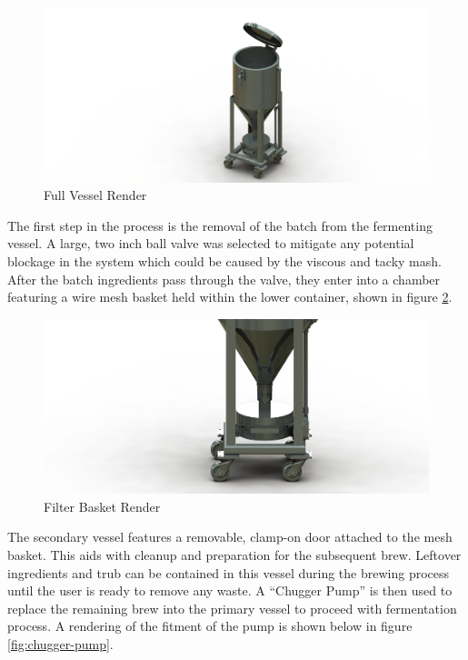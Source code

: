 \documentclass{article}
\begin{document}
\begin{figure}[H]
\begin{center}
\includegraphics[scale=0.10]{full-vessel-render.png}
\caption{Full Vessel Render}
\label{fig:full-vessel-render}
\end{center}
\end{figure}

The first step in the process is the removal of the batch from the fermenting vessel. A large, two inch ball valve was selected to mitigate any potential blockage in the system which could be caused by the viscous and tacky mash.  After the batch ingredients pass through the valve, they enter into a chamber featuring a wire mesh basket held within the lower container, shown in figure \ref{fig:filter-basket-render}.

\begin{figure}[H]
\begin{center}
\includegraphics[scale=0.10]{filter-basket-render.png}
\caption{Filter Basket Render}
\label{fig:filter-basket-render}
\end{center}
\end{figure}

The secondary vessel features a removable, clamp-on door attached to the mesh basket.  This aids with cleanup and preparation for the subsequent brew.  Leftover ingredients and \gls{trub} can be contained in this vessel during the brewing process until the user is ready to remove any waste. A “Chugger Pump” is then used to replace the remaining brew into the primary vessel to proceed with fermentation process.  A rendering of the fitment of the pump is shown below in figure \ref{fig:chugger-pump}.
\end{document}
